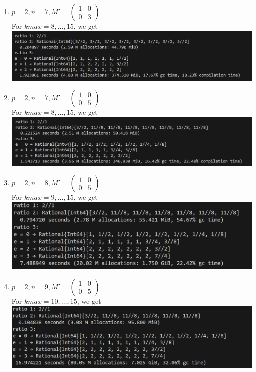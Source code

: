 \documentclass[letterpaper,12pt]{article}
\begin{document}
\begin{enumerate}
\item $p=2, n=7, M' = \begin{pmatrix}
1 & 0 \\ 0 & 3
\end{pmatrix}.$ \\
For $kmax = 8, \dots, 15$, we get \\
\includegraphics[scale=0.4]{ex1.png} \\

\item $p=2, n=7, M' = \begin{pmatrix}
1 & 0 \\ 0 & 5
\end{pmatrix}.$ \\
For $kmax = 8, \dots, 15$, we get \\
\includegraphics[scale=0.4]{ex2.png} \\

\item $p=2, n=8, M' = \begin{pmatrix}
1 & 0 \\ 0 & 5
\end{pmatrix}.$ \\
For $kmax = 9, \dots, 15$, we get \\
\includegraphics[scale=0.4]{ex3.png} \\

\item $p=2, n=9, M' = \begin{pmatrix}
1 & 0 \\ 0 & 5
\end{pmatrix}.$ \\
For $kmax = 10, \dots, 15$, we get \\
\includegraphics[scale=0.4]{ex4.png} \\


\end{enumerate}
\end{document}
